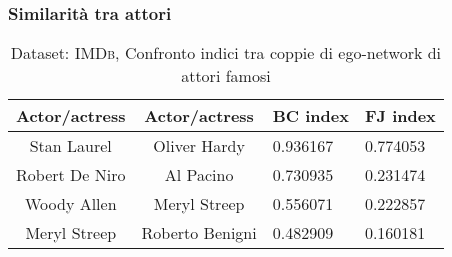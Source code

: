\begin{frame}
	\frametitle{Similarità tra attori}
	
	\centering
	\begin{table}[h]
		\centering
		\begin{tabular}{c|c|l|l}
			Actor/actress  & Actor/actress   & BC index & FJ index \\ 
			\hline
			Stan Laurel    & Oliver Hardy    & 0.936167 & 0.774053 \\
			Robert De Niro & Al Pacino       & 0.730935 & 0.231474 \\
			Woody Allen    & Meryl Streep    & 0.556071 & 0.222857 \\
			Meryl Streep   & Roberto Benigni & 0.482909 & 0.160181 \\
		\end{tabular}
		\caption{Dataset: \textsc{IMDb}, Confronto indici tra coppie di ego-network di attori famosi}
	\end{table}

	
\end{frame}